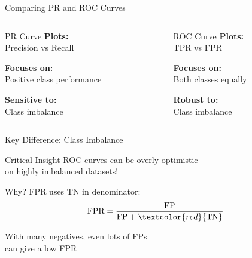 \documentclass{beamer}
\begin{document}
\begin{frame}{Comparing PR and ROC Curves}
\begin{columns}
\begin{column}{0.48\textwidth}
\begin{block}{PR Curve}
\textbf{Plots:} \\
Precision vs Recall

\vspace{0.2cm}

\textbf{Focuses on:} \\
Positive class performance

\vspace{0.2cm}

\textbf{Sensitive to:} \\
Class imbalance
\end{block}
\end{column}

\begin{column}{0.48\textwidth}
\begin{block}{ROC Curve}
\textbf{Plots:} \\
TPR vs FPR

\vspace{0.2cm}

\textbf{Focuses on:} \\
Both classes equally

\vspace{0.2cm}

\textbf{Robust to:} \\
Class imbalance
\end{block}
\end{column}
\end{columns}
\end{frame}

\begin{frame}{Key Difference: Class Imbalance}
\begin{alertblock}{Critical Insight}
ROC curves can be overly optimistic \\
on highly imbalanced datasets!
\end{alertblock}

\vspace{0.3cm}

\begin{examplebox}{Why?}
FPR uses TN in denominator:
$$\text{FPR} = \frac{\text{FP}}{\text{FP} + \textcolor{red}{\text{TN}}}$$

With many negatives, even lots of FPs \\
can give a low FPR
\end{examplebox}
\end{frame}
\end{document}
